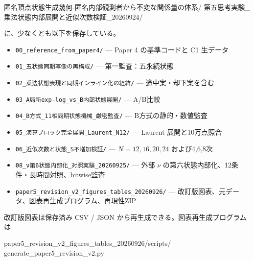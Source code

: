 \documentclass[
  a4paper,
]{ltjsarticle}
\newenvironment{Shaded}{}{}
\newcommand{\NormalTok}[1]{#1}
\providecommand{\tightlist}{%
  \setlength{\itemsep}{0pt}\setlength{\parskip}{0pt}}
\begin{document}
\begin{Shaded}
\begin{Highlighting}[]
\NormalTok{匿名頂点状態生成幾何{-}匿名内部観測者から不変な関係量の体系/}
\NormalTok{第五思考実験\_乗法状態内部展開と近似次数検証\_20260924/}
\end{Highlighting}
\end{Shaded}

に、少なくとも以下を保存している。

\begin{itemize}
\tightlist
\item
  \texttt{00\_\allowbreak{}reference\_\allowbreak{}from\_\allowbreak{}paper4/\allowbreak{}} --- Paper 4 の基準コードと C1
  生データ
\item
  \texttt{01\_\allowbreak{}五状態同期写像の再構成/\allowbreak{}} --- 第一監査：五永続状態
\item
  \texttt{02\_\allowbreak{}乗法状態表現と同期インライン化の経緯/\allowbreak{}} ---
  途中案・却下案を含む
\item
  \texttt{03\_\allowbreak{}A局所exp-log\_\allowbreak{}vs\_\allowbreak{}B内部状態展開/\allowbreak{}} --- A/B比較
\item
  \texttt{04\_\allowbreak{}B方式\_\allowbreak{}11相同期状態機械\_\allowbreak{}厳密監査/\allowbreak{}} ---
  B方式の静的・数値監査
\item
  \texttt{05\_\allowbreak{}演算ブロック完全展開\_\allowbreak{}Laurent\_\allowbreak{}N12/\allowbreak{}} --- Laurent
  展開と10万点照合
\item
  \texttt{06\_\allowbreak{}近似次数と状態\_\allowbreak{}S不増加検証/\allowbreak{}} --- \(N=12,16,20,24\)
  および4,6,8次
\item
  \texttt{08\_\allowbreak{}ν第6状態内部化\_\allowbreak{}対照実験\_\allowbreak{}20260925/\allowbreak{}} --- 外部 \(\nu\)
  の第六状態内部化、12条件・長時間対照、bitwise監査
\item
  \texttt{paper5\_\allowbreak{}revision\_\allowbreak{}v2\_\allowbreak{}figures\_\allowbreak{}tables\_\allowbreak{}20260926/\allowbreak{}} ---
  改訂版図表、元データ、図表再生成プログラム、再現性ZIP
\end{itemize}

改訂版図表は保存済み CSV / JSON から再生成できる。図表再生成プログラムは

\begin{Shaded}
\begin{Highlighting}[]
\NormalTok{paper5\_revision\_v2\_figures\_tables\_20260926/scripts/}
\NormalTok{generate\_paper5\_revision\_v2.py}
\end{Highlighting}
\end{Shaded}
\end{document}
